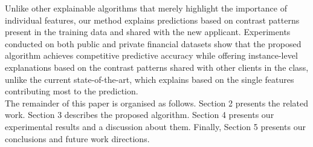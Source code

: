     Unlike other explainable algorithms that merely highlight the importance of individual features, our method explains predictions based on contrast patterns present in the training data and shared with the new applicant. Experiments conducted on both public and private financial datasets show that the proposed algorithm achieves competitive predictive accuracy while offering instance-level explanations based on the contrast patterns shared with other clients in the class, unlike the current state-of-the-art, which explains based on the single features contributing most to the prediction.\\
	
    The remainder of this paper is organised as follows. Section 2 presents the related work. Section 3 describes the proposed algorithm. Section 4 presents our experimental results and a discussion about them. Finally, Section 5 presents our conclusions and future work directions.
    